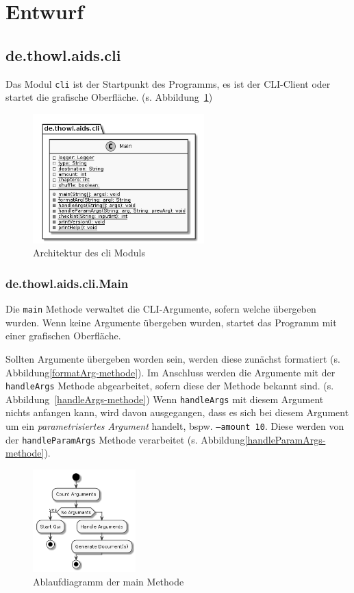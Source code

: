 \documentclass[stu, a4paper, 11pt, floatsintext]{apa7}
\begin{document}
\clearpage

\section{Entwurf}

\subsection{de.thowl.aids.cli}

\noindent Das Modul \texttt{cli} ist der Startpunkt des Programms, es ist der CLI-Client oder startet die grafische Oberfläche. (s. Abbildung~\ref{CLI Architektur})

\begin{figure}[!htbp]
\centering
\includegraphics[width=250px]{../technical_documentation/diagramm/uml/flowcharts/cli/cli.png}
\caption{\label{CLI Architektur}Architektur des cli Moduls}
\end{figure}

\subsubsection{de.thowl.aids.cli.Main}
\noindent Die \texttt{main} Methode verwaltet die CLI-Argumente, sofern welche übergeben wurden.
Wenn keine Argumente übergeben wurden, startet das Programm mit einer grafischen Oberfläche.

Sollten Argumente übergeben worden sein, werden diese zunächst formatiert (s.
Abbildung\ref{formatArg-methode}). Im Anschluss werden die Argumente mit der  \texttt{handleArgs} Methode
abgearbeitet, sofern diese der Methode bekannt sind. (s.  Abbildung~\ref{handleArgs-methode})
Wenn \texttt{handleArgs} mit diesem Argument nichts anfangen kann, wird davon
ausgegangen, dass es sich bei diesem Argument um ein \emph{parametrisiertes Argument} handelt,
bspw. \texttt{–amount 10}. Diese werden von der \texttt{handleParamArgs} Methode verarbeitet (s.
Abbildung\ref{handleParamArgs-methode}).

\begin{figure}[!htbp]
\centering
\includegraphics[width=150px]{../technical_documentation/diagramm/uml/flowcharts/cli/Main.png}
\caption{\label{main-methode}Ablaufdiagramm der main Methode}
\end{figure}
\end{document}
